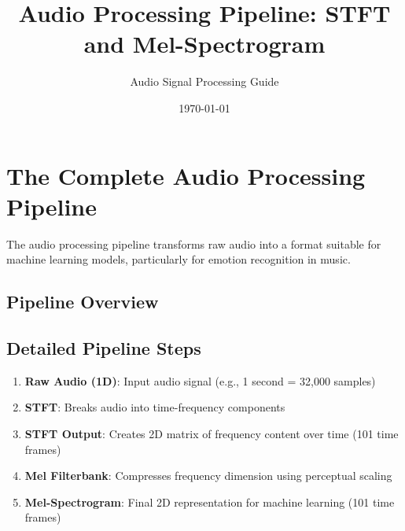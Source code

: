 \documentclass[12pt]{article}
\title{Audio Processing Pipeline: STFT and Mel-Spectrogram}
\author{Audio Signal Processing Guide}
\date{\today}
\begin{document}
\maketitle

\section{The Complete Audio Processing Pipeline}

The audio processing pipeline transforms raw audio into a format suitable for machine learning models, particularly for emotion recognition in music.

\subsection{Pipeline Overview}

\begin{center}
\end{center}

\subsection{Detailed Pipeline Steps}

\begin{enumerate}
    \item \textbf{Raw Audio (1D)}: Input audio signal (e.g., 1 second = 32,000 samples)
    \item \textbf{STFT}: Breaks audio into time-frequency components
    \item \textbf{STFT Output}: Creates 2D matrix of frequency content over time (101 time frames)
    \item \textbf{Mel Filterbank}: Compresses frequency dimension using perceptual scaling
    \item \textbf{Mel-Spectrogram}: Final 2D representation for machine learning (101 time frames)
\end{enumerate}
\end{document}
